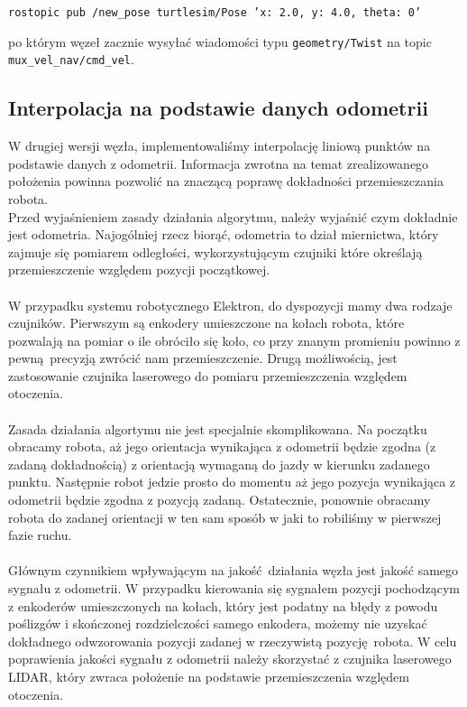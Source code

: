 \documentclass{mwrep}
\begin{document}
\begin{center}
    \texttt{rostopic pub /new\_{}pose turtlesim/Pose '{x: 2.0, y: 4.0, theta: 0}'}
\end{center}

po którym węzeł zacznie wysyłać wiadomości typu \texttt{geometry/Twist} na topic 
\texttt{mux\_{}vel\_{}nav/cmd\_{}vel}.

\newpage

\subsection{Interpolacja na podstawie danych odometrii}
\label{lab1_interpolation_odom}
W drugiej wersji węzła, implementowaliśmy interpolację liniową punktów na podstawie 
danych z odometrii. Informacja zwrotna na temat zrealizowanego położenia powinna 
pozwolić na znaczącą poprawę dokładności przemieszczania robota.\\

\indent{} Przed wyjaśnieniem zasady działania algorytmu, należy wyjaśnić czym dokładnie
jest odometria. Najogólniej rzecz biorąć, odometria to dział miernictwa, który zajmuje się 
pomiarem odległości, wykorzystującym czujniki które określają przemieszczenie względem pozycji 
początkowej. \\
\\
\indent{} W przypadku systemu robotycznego Elektron, do dyspozycji mamy dwa rodzaje czujników.
Pierwszym są enkodery umieszczone na kołach robota, które pozwalają na pomiar o ile obróciło się koło,
co przy znanym promieniu powinno z pewną precyzją zwrócić nam przemieszczenie. Drugą możliwością, jest 
zastosowanie czujnika laserowego do pomiaru przemieszczenia względem otoczenia.\\
\\
\indent{} Zasada działania algortymu nie jest specjalnie skomplikowana. Na początku obracamy robota,
aż jego orientacja wynikająca z odometrii będzie zgodna (z zadaną dokładnością) z orientacją wymaganą do jazdy
w kierunku zadanego punktu. Następnie robot jedzie prosto do momentu aż jego pozycja wynikająca
z odometrii będzie zgodna z pozycją zadaną. Ostatecznie, ponownie obracamy robota do zadanej 
orientacji w ten sam sposób w jaki to robiliśmy w pierwszej fazie ruchu.\\
\\
\indent{} Głównym czynnikiem wpływającym na jakość działania węzła jest jakość samego sygnału
z odometrii. W przypadku kierowania się sygnałem pozycji pochodzącym z enkoderów umieszczonych 
na kołach, który jest podatny na błędy z powodu poślizgów i skończonej rozdzielczości samego enkodera,
możemy nie uzyskać dokładnego odwzorowania pozycji zadanej w rzeczywistą pozycję robota. 
W celu poprawienia jakości sygnału z odometrii należy skorzystać z czujnika laserowego LIDAR, który 
zwraca położenie na podstawie przemieszczenia względem otoczenia. 
\end{document}
